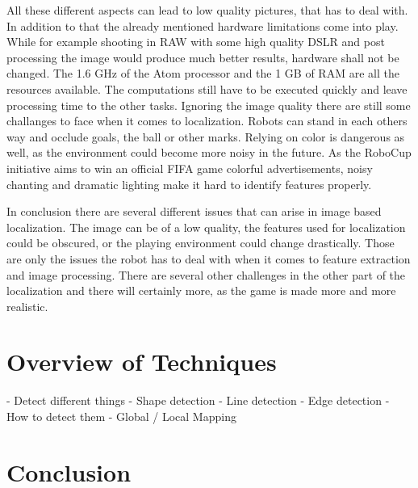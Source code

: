 \documentclass[12pt, a4paper]{scrartcl}
\begin{document}
  All these different aspects can lead to low quality pictures, that has to deal with. In addition to that the already mentioned hardware limitations come into play. While for example shooting in RAW with some high quality DSLR and post processing the image would produce much better results, hardware shall not be changed. The 1.6 GHz of the Atom processor and the 1 GB of RAM are all the resources available. The computations still have to be executed quickly and leave processing time to the other tasks. Ignoring the image quality there are still some challanges to face when it comes to localization. Robots can stand in each others way and occlude goals, the ball or other marks. Relying on color is dangerous as well, as the environment could become more noisy in the future. As the RoboCup initiative aims to win an official FIFA game colorful advertisements, noisy chanting and dramatic lighting make it hard to identify features properly.

  In conclusion there are several different issues that can arise in image based localization. The image can be of a low quality, the features used for localization could be obscured, or the playing environment could change drastically. Those are only the issues the robot has to deal with when it comes to feature extraction and image processing. There are several other challenges in the other part of the localization and there will certainly more, as the game is made more and more realistic.

  \section{Overview of Techniques}
  - Detect different things
  - Shape detection
  - Line detection
  - Edge detection
  - How to detect them
  - Global / Local Mapping

  \section{Conclusion}
\end{document}
